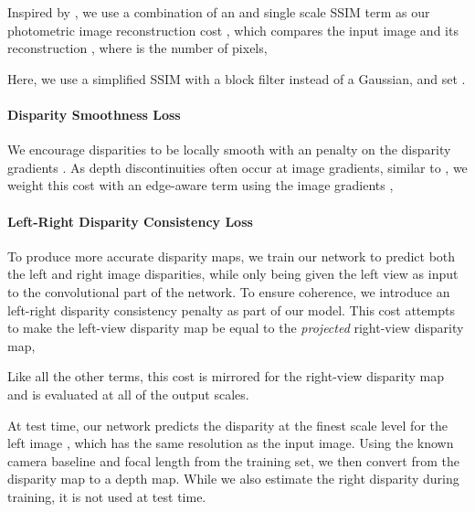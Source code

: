 \documentclass[10pt,twocolumn,letterpaper]{article}
\begin{document}
Inspired by \cite{lossfunctions}, we use a combination of an  and single scale SSIM \cite{wang2004image} term as our photometric image reconstruction cost , which compares the input image  and its reconstruction , where  is the number of pixels,

Here, we use a simplified SSIM with a  block filter instead of a Gaussian, and set .

\paragraph*{Disparity Smoothness Loss}
We encourage disparities to be locally smooth with an  penalty on the disparity gradients . 
As depth discontinuities often occur at image gradients, similar to \cite{heise2013pm}, we weight this cost with an edge-aware term using the image gradients ,
\vspace{-3pt}


\paragraph*{Left-Right Disparity Consistency Loss}
To produce more accurate disparity maps, we train our network to predict both the left and right image disparities, while only being given the left view as input to the convolutional part of the network. 
To ensure coherence, we introduce an  left-right disparity consistency penalty as part of our model. 
This cost attempts to make the left-view disparity map be equal to the \emph{projected} right-view disparity map,

Like all the other terms, this cost is mirrored for the right-view disparity map and is evaluated at all of the output scales.

At test time, our network predicts the disparity at the finest scale level for the left image , which has the same resolution as the input image. 
Using the known camera baseline and focal length from the training set, we then convert from the disparity map to a depth map.  
While we also estimate the right disparity  during training, it is not used at test time. 
\end{document}
